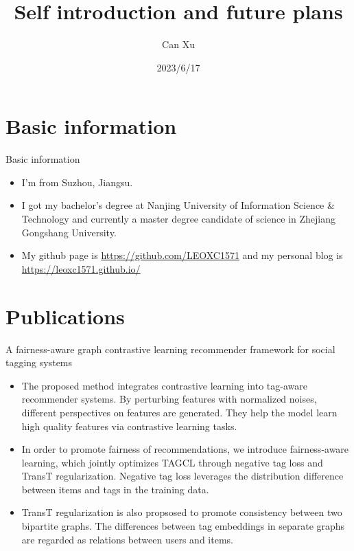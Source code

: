 \documentclass{beamer}
\author{Can Xu}
\title{Self introduction and future plans}
\subtitle{}
\institute{}
\date{2023/6/17}
\begin{document}
\kaishu
\begin{frame}
    \titlepage
    \centering{}
\end{frame}

\begin{frame}
    \tableofcontents[sectionstyle=show,subsectionstyle=show/shaded/hide,subsubsectionstyle=show/shaded/hide]
\end{frame}

\section{Basic information}
\begin{frame}{Basic information}
    \begin{itemize}
        \item I'm from Suzhou, Jiangsu.
        \item I got my bachelor's degree at Nanjing University of Information Science \& Technology and currently a master degree candidate of science in Zhejiang Gongshang University.
        \item My github page is \url{https://github.com/LEOXC1571} and my personal blog is \url{https://leoxc1571.github.io/}
    \end{itemize}
\end{frame}

\section{Publications}
\begin{frame}{A fairness-aware graph contrastive learning recommender framework for social tagging systems}
    \begin{itemize}
        \item The proposed method integrates contrastive learning into tag-aware recommender systems. By perturbing features with normalized noises, different perspectives on features are generated. They help the model learn high quality features via contrastive learning tasks.
        \item In order to promote fairness of recommendations, we introduce fairness-aware learning, which jointly optimizes TAGCL through negative tag loss and TransT regularization. Negative tag loss leverages the distribution difference between items and tags in the training data.
        \item TransT regularization is also propsosed to promote consistency between two bipartite graphs. The differences between tag embeddings in separate graphs are regarded as relations between users and items.
    \end{itemize}
\end{frame}
\end{document}
